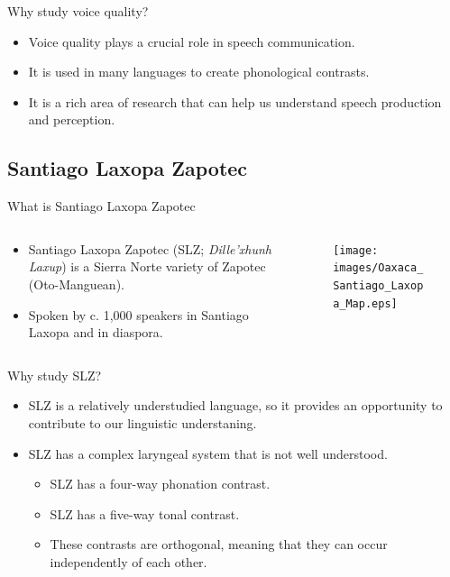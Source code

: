 \documentclass[professionalfont]{beamer}
\begin{document}
\begin{frame}{Why study voice quality?}
  \begin{itemize}
    \item Voice quality plays a crucial role in speech communication.
    \item It is used in many languages to create phonological contrasts.
    \item It is a rich area of research that can help us understand speech production and perception.
  \end{itemize}
\end{frame}

\subsection{Santiago Laxopa Zapotec}

\begin{frame}{What is Santiago Laxopa Zapotec}
  \begin{columns}
    \begin{column}{0.33\textwidth}
      \begin{itemize}
        \item Santiago Laxopa Zapotec (SLZ; \textit{Dille'xhunh Laxup}) is a Sierra Norte variety of Zapotec (Oto-Manguean).
        \item Spoken by c. 1,000 speakers in Santiago Laxopa and in diaspora.
      \end{itemize}
    \end{column}
    \begin{column}{0.67\textwidth}
      \begin{figure}
        \centering
        \texttt{[image: images/Oaxaca\_Santiago\_Laxopa\_Map.eps]}
      \end{figure}
    \end{column}
  \end{columns}
\end{frame}

\begin{frame}{Why study SLZ?}
  \begin{itemize}
        \item SLZ is a relatively understudied language, so it provides an opportunity to contribute to our linguistic understaning.
    \item SLZ has a complex laryngeal system that is not well understood.
    \begin{itemize}
      \item SLZ has a four-way phonation contrast.
      \item SLZ has a five-way tonal contrast.
      \item These contrasts are orthogonal, meaning that they can occur independently of each other.
    \end{itemize} 
  \end{itemize}
\end{frame}
\end{document}
